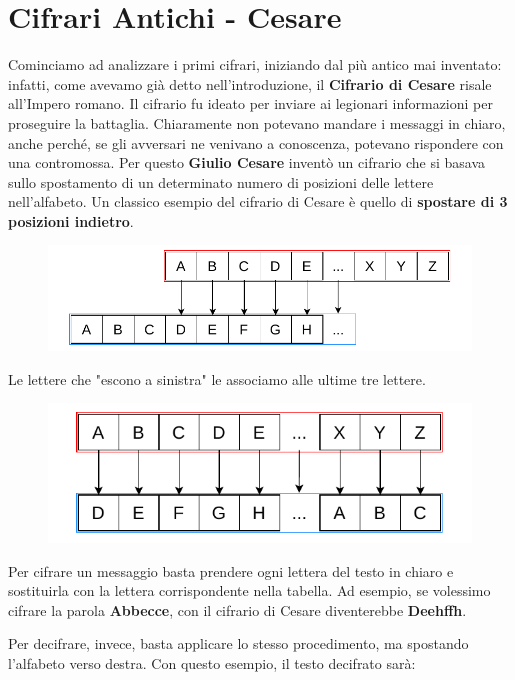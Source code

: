 \documentclass{report}
\begin{document}
\section{Cifrari Antichi - Cesare}

Cominciamo ad analizzare i primi cifrari, iniziando dal più antico mai inventato: infatti, come avevamo già detto nell'introduzione, il \textbf{Cifrario di Cesare} risale all'Impero romano.  
Il cifrario fu ideato per inviare ai legionari informazioni per proseguire la battaglia.  
Chiaramente non potevano mandare i messaggi in chiaro, anche perché, se gli avversari ne venivano a conoscenza, potevano rispondere con una contromossa.  
Per questo \textbf{Giulio Cesare} inventò un cifrario che si basava sullo spostamento di un determinato numero di posizioni delle lettere nell'alfabeto.  
Un classico esempio del cifrario di Cesare è quello di \textbf{spostare di 3 posizioni indietro}.


\begin{figure}[h]
    \centering
    \includegraphics[width=\linewidth]{logos/1_1_cripto.pdf}
\end{figure}


Le lettere che "escono a sinistra" le associamo alle ultime tre lettere.


\begin{figure}[h]
    \centering
    \includegraphics[width=0.8\linewidth]{logos/1_2_cripto.pdf}
\end{figure}

Per cifrare un messaggio basta prendere ogni lettera del testo in chiaro e sostituirla con la lettera corrispondente nella tabella.  
Ad esempio, se volessimo cifrare la parola \textbf{Abbecce}, con il cifrario di Cesare diventerebbe \textbf{Deehffh}.


Per decifrare, invece, basta applicare lo stesso procedimento, ma spostando l'alfabeto verso destra.  
Con questo esempio, il testo decifrato sarà:
\end{document}
